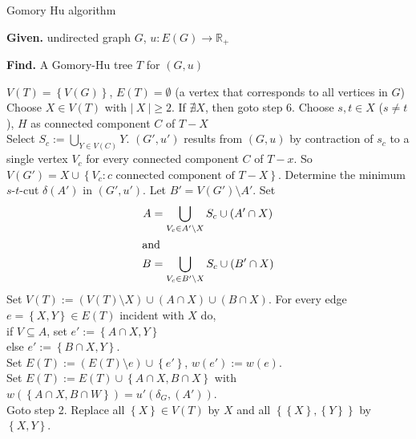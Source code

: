 \documentclass[a4paper]{article}
\theoremstyle{definition}
\newcommand{\card}[1]{\left|\:\!#1\:\!\right|}
\newcommand{\set}[1]{\left\{#1\right\}}
\newcommand{\given}[1]{\textbf{Given.} #1\par}
\newcommand{\find}[1]{\textbf{Find.} #1\par}
\begin{document}
\begin{algorithm}
  \caption{Gomory Hu algorithm}
  \label{gomory-hu-algo}
  \given{undirected graph $G$, $u: E(G) \rightarrow \mathbb{R}_+$}
  \find{A Gomory-Hu tree $T$ for $(G, u)$}
\begin{algorithmic}[1]
  \State $V(T) = \set{V(G)}$, $E(T) = \emptyset$ (a vertex that corresponds to all vertices in $G$)
  \State Choose $X \in V(T)$ with $\card{X} \geq 2$. If $\nexists X$, then goto step 6.
  \State Choose $s,t \in X$ ($s \neq t$), $H$ as connected component $C$ of $T-X$ \\
         Select $S_c := \bigcup_{Y \in V(C)} Y$. $(G', u')$ results from $(G, u)$ by contraction of $s_c$ to a single vertex $V_c$ for every connected component $C$ of $T-x$. So $V(G') = X \cup \set{V_c: c \text{ connected component of } T-X}$.
  \State
    Determine the minimum $s$-$t$-cut $\delta(A')$ in $(G', u')$. Let $B' = V(G') \setminus A'$.
    Set
    \begin{align*}
      A &= \bigcup_{V_c \in A' \setminus X} S_c \cup (A' \cap X) \\
      \intertext{and}
      B &= \bigcup_{V_c \in B' \setminus X} S_c \cup (B' \cap X)
    \end{align*}
  \State
    Set $V(T) := (V(T) \setminus X) \cup (A \cap X) \cup (B \cap X)$.
  \State
    For every edge $e = \set{X, Y} \in E(T)$ incident with $X$ do, \\
    \hspace{20pt} if $V \subseteq A$, set $e' := \set{A \cap X, Y}$ \\
    \hspace{20pt} else $e' := \set{B \cap X, Y}$. \\
    \hspace{20pt} Set $E(T) := (E(T) \setminus e) \cup \set{e'}$, $w(e') := w(e)$. \\
    \hspace{20pt} Set $E(T) := E(T) \cup \set{A \cap X, B \cap X}$ with \\
    \hspace{40pt} $w(\set{A \cap X, B \cap W}) = u'(\delta_G, (A'))$. \\
    \hspace{20pt} Goto step 2.
  \State Replace all $\set{X} \in V(T)$ by $X$ and all $\set{\set{X}, \set{Y}}$ by $\set{X, Y}$.
\end{algorithmic}
\end{algorithm}
\end{document}
